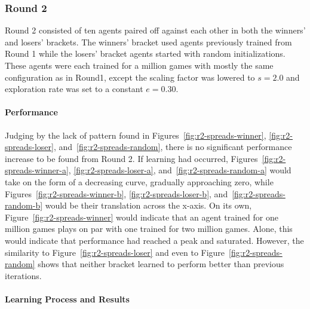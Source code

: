 
\subsubsection*{Round 2}
\label{sec:findings-r2}

Round 2 consisted of ten agents paired off against each other
in both the winners' and losers' brackets.
%
The winners' bracket used agents previously trained from Round 1
while the losers' bracket agents started with random initializations.
%
These agents were each trained for a million games
with mostly the same configuration as in Round1,
except the scaling factor was lowered to $s = 2.0$
and exploration rate was set to a constant $e = 0.30$.

\paragraph*{Performance}
\label{sec:findings-r2-perf}

Judging by the lack of pattern found in
Figures~\ref{fig:r2-spreads-winner},
\ref{fig:r2-spreads-loser},
and~\ref{fig:r2-spreads-random},
there is no significant performance increase to be found from Round 2.
%
If learning had occurred,
Figures~\ref{fig:r2-spreads-winner-a},
\ref{fig:r2-spreads-loser-a},
and~\ref{fig:r2-spreads-random-a}
would take on the form of a decreasing curve,
gradually approaching zero,
while Figures~\ref{fig:r2-spreads-winner-b},
\ref{fig:r2-spreads-loser-b},
and~\ref{fig:r2-spreads-random-b}
would be their translation across the x-axis.
%
On its own, Figure~\ref{fig:r2-spreads-winner}
would indicate that an agent trained for one million games plays on par with
one trained for two million games.
%
Alone,
this would indicate that performance had reached a peak and saturated.
%
However,
the similarity to Figure~\ref{fig:r2-spreads-loser}
and even to Figure~\ref{fig:r2-spreads-random}
shows that neither bracket learned to perform better than previous iterations.









\paragraph*{Learning Process and Results}
\label{sec:findings-r2-results}

